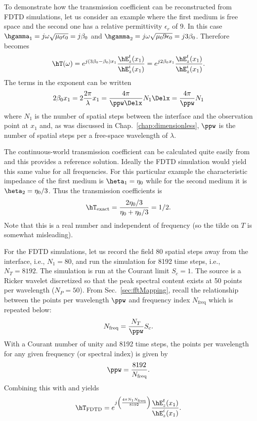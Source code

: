 To demonstrate how the transmission coefficient can be
reconstructed from FDTD simulations, let us consider an example where
the first medium is free space and the second one has a relative
permittivity $\epsilon_r$ of $9$.  In this case
$\hgamma_1=j\omega\sqrt{\mu_0\epsilon_0}=j\beta_0$ and
$\hgamma_2=j\omega\sqrt{\mu_0 9\epsilon_0}=j3\beta_0$.
Therefore  becomes
\begin{equation}
  \hT(\omega) = e^{j(3\beta_0-\beta_0) x_1}
  \frac{\hE_z^t(x_1)}{\hE_z^i(x_1)}
  = e^{j2\beta_0 x_1}
  \frac{\hE_z^t(x_1)}{\hE_z^i(x_1)}.
\end{equation}
The terms in the exponent can be written
\begin{equation}
  2\beta_0 x_1 = 2\frac{2\pi}{\lambda}x_1 = 
  \frac{4\pi}{\ppw\Delx}N_1\Delx =
  \frac{4\pi}{\ppw}N_1
  \label{eq:transExponent}
\end{equation}
where $N_1$ is the number of spatial steps between the interface and
the observation point at $x_1$ and, as was discussed in Chap.\
\ref{chap:dimensionless}, $\ppw$ is the number of spatial steps per a
free-space wavelength of $\lambda$.

The continuous-world transmission coefficient can be calculated quite
easily from \refeq{eq:transCoefSpectral} and this provides a reference
solution.  Ideally the FDTD simulation would yield this same value for
all frequencies.  For this particular example the characteristic
impedance of the first medium is $\heta_1=\eta_0$ while for the second
medium it is $\heta_2=\eta_0/3$.  Thus the transmission coefficients
is
\begin{equation}
  \hT_{\mbox{\scriptsize exact}} = \frac{2\eta_0/3}{\eta_0+\eta_0/3} = 1/2.
  \label{eq:transExact}
\end{equation}
Note that this is a real number and independent of frequency (so the
tilde on $T$ is somewhat misleading).

For the FDTD simulations, let us record the field 80 spatial steps
away from the interface, i.e., $N_1=80$, and run the simulation for
8192 time steps, i.e., $N_T=8192$.  The simulation is run at the
Courant limit $S_c=1$.  The source is a Ricker wavelet discretized so
that the peak spectral content exists at 50 points per wavelength
($N_P=50$).  From Sec.\
\ref{sec:fftMapping}, recall the relationship between the points per
wavelength $\ppw$ and frequency index $N_{\mathrm{freq}}$ which is
repeated below:
\begin{equation}
  N_{\mathrm{freq}} = \frac{N_T}{\ppw} S_c.
\end{equation}
With a Courant number of unity and 8192 time steps, the points per
wavelength for any given frequency (or spectral index) is given by
\begin{equation}
  \ppw = \frac{8192}{N_{\mathrm{freq}}}.
\end{equation}
Combining this with  and
 yields
\begin{equation}
  \hT_{\mbox{\scriptsize FDTD}}
  = e^{j\left(\frac{4\pi N_1N_{\mathrm{freq}}}{8192}\right)}
  \frac{\hE_z^t(x_1)}{\hE_z^i(x_1)}.
  \label{eq:transFDTD}
\end{equation}

